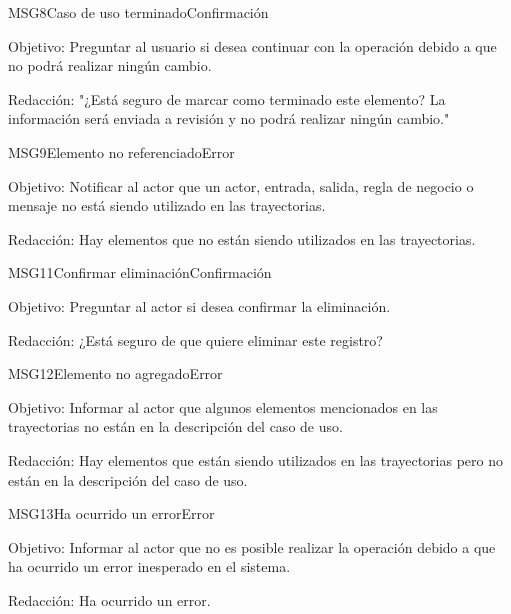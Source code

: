 \begin{mensaje}{MSG8}{Caso de uso terminado}{Confirmación}
    \item[Objetivo:] Preguntar al usuario si desea continuar con la operación debido a que no podrá realizar ningún cambio.
    \item[Redacción:] "¿Está seguro de marcar como terminado este elemento? La información será enviada a revisión y no podrá realizar ningún cambio."
\end{mensaje}

\begin{mensaje}{MSG9}{Elemento no referenciado}{Error}
    \item[Objetivo:] Notificar al actor que un actor, entrada, salida, regla de negocio o mensaje no está siendo utilizado en las trayectorias.
    \item[Redacción:] Hay elementos que no están siendo utilizados en las trayectorias.
\end{mensaje}


\begin{mensaje}{MSG11}{Confirmar eliminación}{Confirmación}
    \item[Objetivo:] Preguntar al actor si desea confirmar la eliminación.
    \item[Redacción:] ¿Está seguro de que quiere eliminar este registro?
\end{mensaje}

\begin{mensaje}{MSG12}{Elemento no agregado}{Error}
    \item[Objetivo:] Informar al actor que algunos elementos mencionados en las trayectorias no están en la descripción del caso de uso.
    \item[Redacción:] Hay elementos que están siendo utilizados en las trayectorias pero no están en la descripción del caso de uso.
\end{mensaje}
\begin{mensaje}{MSG13}{Ha ocurrido un error}{Error}
    \item[Objetivo:] Informar al actor que no es posible realizar la operación debido a que ha ocurrido un error inesperado en el sistema.
    \item[Redacción:] Ha ocurrido un error.
\end{mensaje}
	
